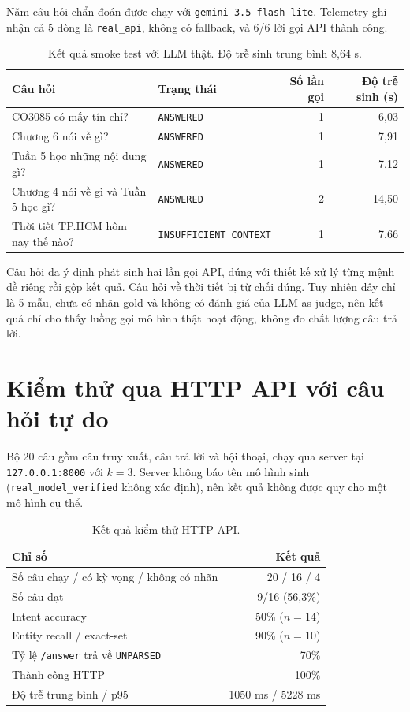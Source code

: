 Năm câu hỏi chẩn đoán được chạy với \texttt{gemini-3.5-flash-lite}. Telemetry ghi nhận cả 5 dòng là \texttt{real\_api}, không có fallback, và 6/6 lời gọi API thành công.

\begin{table}[H]
\centering
\small
\begin{tabular}{@{}p{}lrr@{}}
\toprule
Câu hỏi & Trạng thái & Số lần gọi & Độ trễ sinh (s) \\
\midrule
CO3085 có mấy tín chỉ? & \texttt{ANSWERED} & 1 & 6,03 \\
Chương 6 nói về gì? & \texttt{ANSWERED} & 1 & 7,91 \\
Tuần 5 học những nội dung gì? & \texttt{ANSWERED} & 1 & 7,12 \\
Chương 4 nói về gì và Tuần 5 học gì? & \texttt{ANSWERED} & 2 & 14,50 \\
Thời tiết TP.HCM hôm nay thế nào? & \texttt{INSUFFICIENT\_CONTEXT} & 1 & 7,66 \\
\bottomrule
\end{tabular}
\caption{Kết quả smoke test với LLM thật. Độ trễ sinh trung bình 8,64 s.}
\end{table}

Câu hỏi đa ý định phát sinh hai lần gọi API, đúng với thiết kế xử lý từng mệnh đề riêng rồi gộp kết quả. Câu hỏi về thời tiết bị từ chối đúng. Tuy nhiên đây chỉ là 5 mẫu, chưa có nhãn gold và không có đánh giá của LLM-as-judge, nên kết quả chỉ cho thấy luồng gọi mô hình thật hoạt động, không đo chất lượng câu trả lời.

\section{Kiểm thử qua HTTP API với câu hỏi tự do}

Bộ 20 câu gồm câu truy xuất, câu trả lời và hội thoại, chạy qua server tại \texttt{127.0.0.1:8000} với $k=3$. Server không báo tên mô hình sinh (\texttt{real\_model\_verified} không xác định), nên kết quả không được quy cho một mô hình cụ thể.

\begin{table}[H]
\centering
\small
\begin{tabular}{@{}lr@{}}
\toprule
Chỉ số & Kết quả \\
\midrule
Số câu chạy / có kỳ vọng / không có nhãn & 20 / 16 / 4 \\
Số câu đạt & 9/16 (56,3\%) \\
Intent accuracy & 50\% ($n=14$) \\
Entity recall / exact-set & 90\% ($n=10$) \\
Tỷ lệ \texttt{/answer} trả về \texttt{UNPARSED} & 70\% \\
Thành công HTTP & 100\% \\
Độ trễ trung bình / p95 & 1050 ms / 5228 ms \\
\bottomrule
\end{tabular}
\caption{Kết quả kiểm thử HTTP API.}
\end{table}


